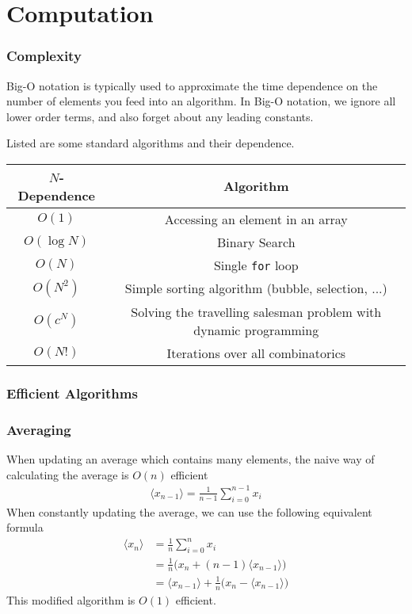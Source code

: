 \chapter{Computation}

\subsection{Complexity}

Big-O notation is typically used to approximate the time dependence on the number of elements you feed into an algorithm. In Big-O notation, we ignore all lower order terms, and also forget about any leading constants.

Listed are some standard algorithms and their dependence.

\begin{center}
\begin{tabular}{ | c | c|} 
\hline
 $N$-Dependence & Algorithm\\ \hline
$O(1)$ & Accessing an element in an array  \\ 
$O(\log N)$ & Binary Search  \\
$O(N)$ & Single \texttt{for} loop \\ 
$O(N^2)$ & Simple sorting algorithm (bubble, selection, ...)\\
$O(c^N)$ & Solving the travelling salesman problem with dynamic programming \\
$O(N!)$ & Iterations over all combinatorics \\
\hline
\end{tabular}
\end{center}

\subsection{Efficient Algorithms}

\subsection{Averaging}
When updating an average which contains many elements, the naive way of calculating the average is $O(n)$ efficient 
\begin{align}
	\langle x_{n-1}\rangle = \frac{1}{n-1}\sum_{i=0}^{n-1} x_i
\end{align}
When constantly updating the average, we can use the following equivalent formula
\begin{align}
	\langle x_{n}\rangle &= \frac{1}{n}\sum_{i=0}^{n} x_i\\
	&= \frac{1}{n}\Big(x_n + (n-1)\langle x_{n-1}\rangle\Big)\\
	&= \langle x_{n-1}\rangle + \frac{1}{n}\Big(x_n - \langle x_{n-1} \rangle\Big)
\end{align}
This modified algorithm is $O(1)$ efficient.

